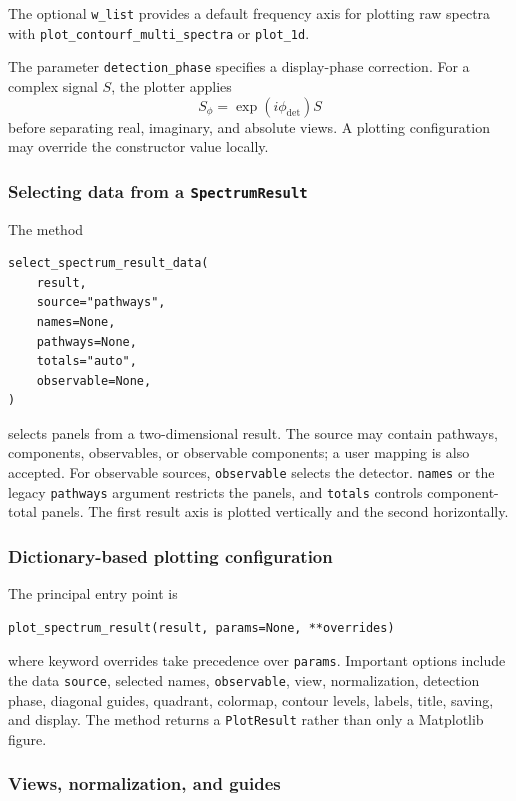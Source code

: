 \documentclass[11pt]{article}
\begin{document}
The optional \texttt{w\_list} provides a default frequency axis for plotting raw spectra with \texttt{plot\_contourf\_multi\_spectra} or \texttt{plot\_1d}. 

The parameter \texttt{detection\_phase} specifies a display-phase correction. For a complex signal $S$, the plotter applies
\begin{equation}
    S_{\phi}=\exp(i\phi_{\mathrm{det}})S
\end{equation}
before separating real, imaginary, and absolute views. A plotting configuration may override the constructor value locally.


\subsubsection{Selecting data from a \texttt{SpectrumResult}}

The method
\begin{verbatim}
select_spectrum_result_data(
    result,
    source="pathways",
    names=None,
    pathways=None,
    totals="auto",
    observable=None,
)
\end{verbatim}

selects panels from a two-dimensional result. The source may contain pathways, components, observables, or observable components; a user mapping is also accepted. For observable sources, \texttt{observable} selects the detector. \texttt{names} or the legacy \texttt{pathways} argument restricts the panels, and \texttt{totals} controls component-total panels. The first result axis is plotted vertically and the second horizontally.



\subsubsection{Dictionary-based plotting configuration}

The principal entry point is
\begin{verbatim}
plot_spectrum_result(result, params=None, **overrides)
\end{verbatim}
where keyword overrides take precedence over \texttt{params}. Important options include the data \texttt{source}, selected names, \texttt{observable}, view, normalization, detection phase, diagonal guides, quadrant, colormap, contour levels, labels, title, saving, and display. The method returns a \texttt{PlotResult} rather than only a Matplotlib figure.

\subsubsection{Views, normalization, and guides}
\end{document}
